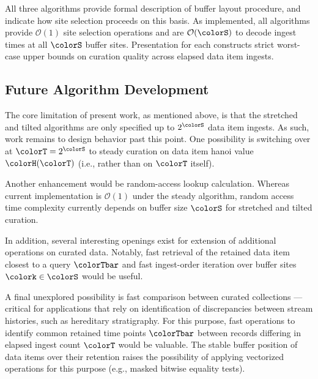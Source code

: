 All three algorithms provide formal description of buffer layout procedure, and indicate how site selection proceeds on this basis.
As implemented, all algorithms provide $\mathcal{O}(1)$ site selection operations and are $\mathcal{O}(\colorS)$ to decode ingest times at all $\colorS$ buffer sites.
Presentation for each constructs strict worst-case upper bounds on curation quality across elapsed data item ingests.

\subsection{Future Algorithm Development}

The core limitation of present work, as mentioned above, is that the stretched and tilted algorithms are only specified up to $2^{\colorS}$ data item ingests.
As such, work remains to design behavior past this point.
One possibility is switching over at $\colorT = 2^{\colorS}$ to steady curation on data item hanoi value $\colorH(\colorT)$ (i.e., rather than on $\colorT$ itself).

Another enhancement would be random-access lookup calculation.
Whereas current implementation is $\mathcal{O}(1)$ under the steady algorithm, random access time complexity currently depends on buffer size $\colorS$ for stretched and tilted curation.

In addition, several interesting openings exist for extension of additional operations on curated data.
Notably, fast retrieval of the retained data item closest to a query $\colorTbar$ and fast ingest-order iteration over buffer sites $\colork \in \colorS$ would be useful.

A final unexplored possibility is fast comparison between curated collections --- critical for applications that rely on identification of discrepancies between stream histories, such as hereditary stratigraphy.
For this purpose, fast operations to identify common retained time points $\colorTbar$ between records differing in elapsed ingest count $\colorT$ would be valuable.
The stable buffer position of data items over their retention raises the possibility of applying vectorized operations for this purpose (e.g., masked bitwise equality tests).



